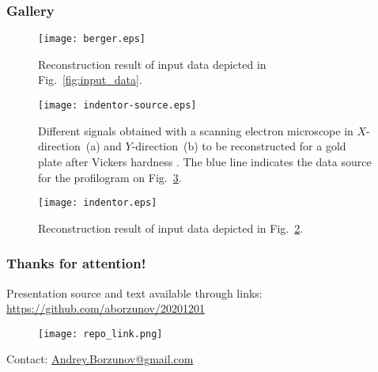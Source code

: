 \documentclass{beamer}
\begin{document}
\begin{frame}[c,allowframebreaks]
    \frametitle{Gallery}

    \begin{figure}
        \texttt{[image: berger.eps]}
        \caption{Reconstruction result of input data depicted in Fig.~\ref{fig:input_data}.}
        {\label{fig:berger}}%
    \end{figure}

\framebreak

    \begin{figure}
        \texttt{[image: indentor-source.eps]}
        \caption{Different signals obtained with a scanning electron microscope in $X$-direction~(a) and $Y$-direction~(b) to be reconstructed for a gold plate after Vickers hardness . The blue line indicates the data source for the profilogram on Fig.~\ref{fig:indentor}.}
        {\label{fig:indentor-source}}%
    \end{figure}

\framebreak

    \begin{figure}
        \texttt{[image: indentor.eps]}
        \caption{Reconstruction result of input data depicted in Fig.~\ref{fig:indentor-source}.}
        {\label{fig:indentor}}%
    \end{figure}

\end{frame}

\begin{frame}[c,allowframebreaks]
    
\end{frame}

\begin{frame}[c]
    \frametitle{Thanks for attention!}
    Presentation source and text available through links:
    \url{https://github.com/aborzunov/20201201}
    \begin{figure}
        \texttt{[image: repo\_link.png]}
    \end{figure}
     Contact: \url{Andrey.Borzunov@gmail.com}
\end{frame}
\end{document}
